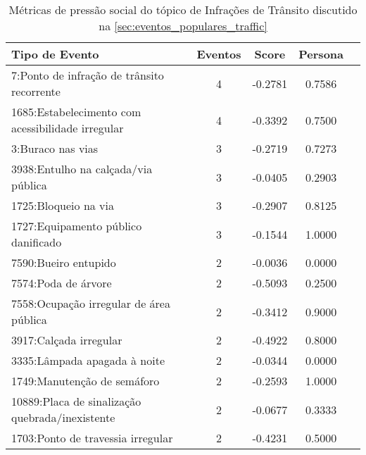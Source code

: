 \begin{table}[htbp]
	\centering
	\caption{Métricas de pressão social do tópico de Infrações de Trânsito discutido na \autoref{sec:eventos_populares_traffic}}
	\label{tab:eventos_populares_traffic}
	\begin{tabular}{|l|c|c|c|c|}
		\hline
		\textbf{Tipo de Evento}                           & \textbf{Eventos} & \textbf{Score} & \textbf{Persona} \\
		\hline
		7:Ponto de infração de trânsito recorrente        & 4                & -0.2781        & 0.7586           \\
		\hline
		1685:Estabelecimento com acessibilidade irregular & 4                & -0.3392        & 0.7500           \\
		\hline
		3:Buraco nas vias                                 & 3                & -0.2719        & 0.7273           \\
		\hline
		3938:Entulho na calçada/via pública               & 3                & -0.0405        & 0.2903           \\
		\hline
		1725:Bloqueio na via                              & 3                & -0.2907        & 0.8125           \\
		\hline
		1727:Equipamento público danificado               & 3                & -0.1544        & 1.0000           \\
		\hline
		7590:Bueiro entupido                              & 2                & -0.0036        & 0.0000           \\
		\hline
		7574:Poda de árvore                               & 2                & -0.5093        & 0.2500           \\
		\hline
		7558:Ocupação irregular de área pública           & 2                & -0.3412        & 0.9000           \\
		\hline
		3917:Calçada irregular                            & 2                & -0.4922        & 0.8000           \\
		\hline
		3335:Lâmpada apagada à noite                      & 2                & -0.0344        & 0.0000           \\
		\hline
		1749:Manutenção de semáforo                       & 2                & -0.2593        & 1.0000           \\
		\hline
		10889:Placa de sinalização quebrada/inexistente   & 2                & -0.0677        & 0.3333           \\
		\hline
		1703:Ponto de travessia irregular                 & 2                & -0.4231        & 0.5000           \\

\end{tabular}
\end{table}

